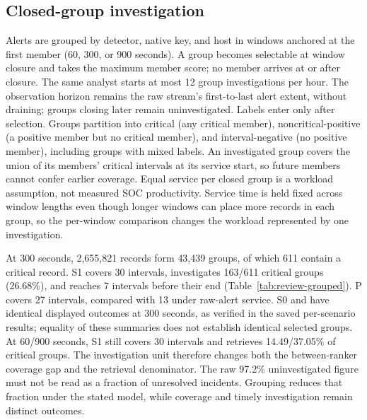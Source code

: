 \subsection{Closed-group investigation}
Alerts are grouped by detector, native key, and host in windows anchored at the first member (60, 300, or 900 seconds). A group becomes selectable at window closure and takes the maximum member score; no member arrives at or after closure. The same analyst starts at most 12 group investigations per hour. The observation horizon remains the raw stream's first-to-last alert extent, without draining; groups closing later remain uninvestigated. Labels enter only after selection. Groups partition into critical (any critical member), noncritical-positive (a positive member but no critical member), and interval-negative (no positive member), including groups with mixed labels. An investigated group covers the union of its members' critical intervals at its service start, so future members cannot confer earlier coverage. Equal service per closed group is a workload assumption, not measured SOC productivity. Service time is held fixed across window lengths even though longer windows can place more records in each group, so the per-window comparison changes the workload represented by one investigation.

At 300 seconds, 2,655,821 records form 43,439 groups, of which 611 contain a critical record. S1\key{} covers 30 intervals, investigates 163/611 critical groups (26.68\%), and reaches 7 intervals before their end (Table~\ref{tab:review-grouped}). P covers 27 intervals, compared with 13 under raw-alert service. S0\key{} and \Rsev{} have identical displayed outcomes at 300 seconds, as verified in the saved per-scenario results; equality of these summaries does not establish identical selected groups. At 60/900 seconds, S1\key{} still covers 30 intervals and retrieves 14.49/37.05\% of critical groups. The investigation unit therefore changes both the between-ranker coverage gap and the retrieval denominator. The raw 97.2\% uninvestigated figure must not be read as a fraction of unresolved incidents. Grouping reduces that fraction under the stated model, while coverage and timely investigation remain distinct outcomes.

\begin{tableorg}[htbp]
\centering\small
\caption{Grouped replay with 300-second windows and 12 groups/h: 11,500 starts per ranker. Coverage is out of 32 intervals. Starts partition into interval-negative, noncritical-positive, and critical groups (Online Resource~1, Section~S9). Critical groups reports investigated / all critical groups, including those not released by the horizon. Critical members counts raw critical records contained in investigated groups; these are not separate investigations or confirmed attacks.}
\label{tab:review-grouped}
\resizebox{\textwidth}{!}{}
\end{tableorg}
